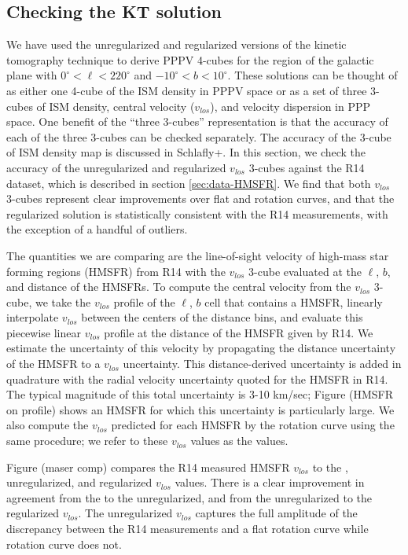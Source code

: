 \subsection{Checking the KT solution}
\label{sec:KT-validation}

We have used the unregularized and regularized versions of the kinetic tomography technique to derive PPPV 4-cubes for the region of the galactic plane with $0^\circ < \ell < 220^\circ$ and $-10^\circ < b < 10^\circ$. %
These solutions can be thought of as either one 4-cube of the ISM density in PPPV space or as a set of three 3-cubes of ISM density, central velocity ($v_{los}$), and velocity dispersion in PPP space. One benefit of the ``three 3-cubes'' representation is that the accuracy of each of the three 3-cubes can be checked separately. The accuracy of the 3-cube of ISM density map is discussed in Schlafly+. In this section, we check the accuracy of the unregularized and regularized $v_{los}$ 3-cubes against the R14 dataset, which is described in section \ref{sec:data-HMSFR}. We find that both $v_{los}$ 3-cubes represent clear improvements over flat and \cite{Clemens_1985} rotation curves, and that the regularized solution is statistically consistent with the R14 measurements, with the exception of a handful of outliers. 

The quantities we are comparing are the line-of-sight velocity of high-mass star forming regions (HMSFR) from R14 with the $v_{los}$ 3-cube evaluated at the $\ell$, $b$, and distance of the HMSFRs. To compute the central velocity from the $v_{los}$ 3-cube, we take the $v_{los}$ profile of the $\ell$, $b$ cell that contains a HMSFR, linearly interpolate $v_{los}$ between the centers of the distance bins, and evaluate this piecewise linear $v_{los}$ profile at the distance of the HMSFR given by R14. We estimate the uncertainty of this velocity by propagating the distance uncertainty of the HMSFR to a $v_{los}$ uncertainty. This distance-derived uncertainty is added in quadrature with the radial velocity uncertainty quoted for the HMSFR in R14. The typical magnitude of this total uncertainty is 3-10 km/sec; Figure (HMSFR on profile) shows an HMSFR for which this uncertainty is particularly large. We also compute the $v_{los}$ predicted for each HMSFR by the \citet{Clemens_1985} rotation curve using the same procedure; we refer to these $v_{los}$ values as the \Clemens values. 

Figure (maser comp) compares the R14 measured HMSFR $v_{los}$ to the \Clemens, unregularized, and regularized $v_{los}$ values. There is a clear improvement in agreement from the \Clemnens to the unregularized, and from the unregularized to the regularized $v_{los}$. The unregularized $v_{los}$ captures the full amplitude of the discrepancy between the R14 measurements and a flat rotation curve while \Clemens rotation curve does not. 

